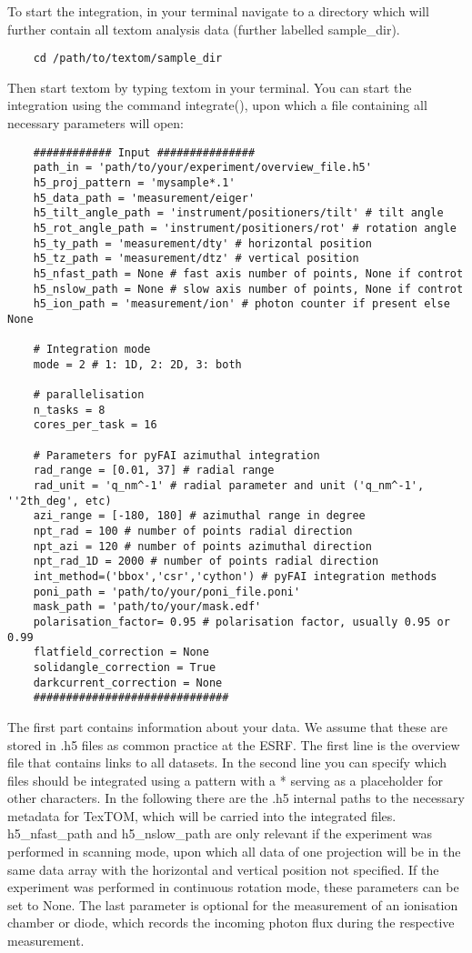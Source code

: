 To start the integration, in your terminal navigate to a directory which will further contain all 
textom analysis data (further labelled sample\_dir).
\begin{verbatim}
    cd /path/to/textom/sample_dir
\end{verbatim}
Then start textom by typing textom in your terminal.
You can start the integration using the command integrate(), upon which a file containing all necessary
parameters will open:
\begin{verbatim}
    ############ Input ###############
    path_in = 'path/to/your/experiment/overview_file.h5'
    h5_proj_pattern = 'mysample*.1'
    h5_data_path = 'measurement/eiger'
    h5_tilt_angle_path = 'instrument/positioners/tilt' # tilt angle
    h5_rot_angle_path = 'instrument/positioners/rot' # rotation angle
    h5_ty_path = 'measurement/dty' # horizontal position
    h5_tz_path = 'measurement/dtz' # vertical position
    h5_nfast_path = None # fast axis number of points, None if controt
    h5_nslow_path = None # slow axis number of points, None if controt
    h5_ion_path = 'measurement/ion' # photon counter if present else None
    
    # Integration mode
    mode = 2 # 1: 1D, 2: 2D, 3: both
    
    # parallelisation
    n_tasks = 8
    cores_per_task = 16
    
    # Parameters for pyFAI azimuthal integration
    rad_range = [0.01, 37] # radial range
    rad_unit = 'q_nm^-1' # radial parameter and unit ('q_nm^-1', ''2th_deg', etc)
    azi_range = [-180, 180] # azimuthal range in degree
    npt_rad = 100 # number of points radial direction
    npt_azi = 120 # number of points azimuthal direction
    npt_rad_1D = 2000 # number of points radial direction
    int_method=('bbox','csr','cython') # pyFAI integration methods
    poni_path = 'path/to/your/poni_file.poni'
    mask_path = 'path/to/your/mask.edf'
    polarisation_factor= 0.95 # polarisation factor, usually 0.95 or 0.99
    flatfield_correction = None
    solidangle_correction = True
    darkcurrent_correction = None
    ##############################
\end{verbatim}
The first part contains information about your data. We assume that these are stored in .h5 files as common practice
at the ESRF. The first line is the overview file that contains links to all datasets. In the second line you can
specify which files should be integrated using a pattern with a * serving as a placeholder for other characters.
In the following there are the .h5 internal paths to the necessary metadata for TexTOM, which will be carried into the
integrated files. h5\_nfast\_path and h5\_nslow\_path are only relevant if the experiment was performed in scanning mode,
upon which all data of one projection will be in the same data array with the horizontal and vertical position not specified.
If the experiment was performed in continuous rotation mode, these parameters can be set to None.
The last parameter is optional for the measurement of an ionisation chamber or diode, which records the incoming photon
flux during the respective measurement.

